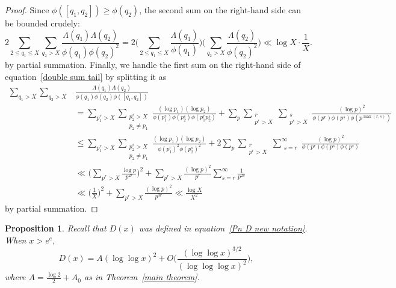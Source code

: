\documentclass[12pt,reqno]{amsart}
\newtheorem{prop}[theorem]{Proposition}
\theoremstyle{definition}
\begin{document}
\begin{proof}
Since $\phi([q_1, q_2]) \geq \phi(q_2)$, the second sum on the right-hand side can be bounded crudely:
\[
2 \sum_{2 \leq q_1 \leq X} \sum_{q_2 > X} \frac{\Lambda(q_1)\Lambda(q_2)}{\phi(q_1)\phi(q_2)^2} = 2 \bigg( \sum_{2 \leq q_1 \leq X} \frac{\Lambda(q_1)}{\phi(q_1)} \bigg) \bigg( \sum_{q_2 > X} \frac{\Lambda(q_2)}{\phi(q_2)^2} \bigg) \ll {\log X} \cdot \frac1{X}.
\]
by partial summation. Finally, we handle the first sum on the right-hand side of equation~\eqref{double sum tail} by splitting it as
\begin{align*}
\sum_{q_1>X}\sum_{q_2>X} & \frac{\Lambda(q_1)\Lambda(q_2)}{\phi(q_1)\phi(q_2)\phi([q_1, q_2])} \\
&= \sum_{p_1^r>X} \sum_{\substack{p_2^s>X \\ p_2\ne p_1}} \frac{(\log p_1)(\log p_2)}{\phi(p_1^r)\phi(p_2^s)\phi(p_1^r p_2^s)} + \sum_p \sum_{\substack{r \\ p^r > X}} \sum_{\substack{s \\ p^s > X}} \frac{(\log p)^2}{\phi(p^r)\phi(p^s)\phi(p^{\max(r, s)})} \\
&\le \sum_{p_1^r>X} \sum_{\substack{p_2^s>X \\ p_2\ne p_1}} \frac{(\log p_1)(\log p_2)}{\phi(p_1^r)^2\phi(p_2^s)^2} + 2 \sum_p \sum_{\substack{r \\ p^r > X}} \sum_{\substack{s=r}}^\infty \frac{(\log p)^2}{\phi(p^r)\phi(p^s)\phi(p^s)} \\
&\ll \bigg( \sum_{p^r > X} \frac{\log p}{p^{2r}} \bigg)^2 + \sum_{p^r>X} \frac{(\log p)^2}{p^r} \sum_{s=r}^\infty \frac1{p^{2s}} \\
&\ll \bigg( \frac1X \bigg)^2 + \sum_{p^r>X} \frac{(\log p)^2}{p^{3r}} \ll \frac{\log X}{X^2}
\end{align*}
by partial summation.
\end{proof}

\begin{prop}\label{constant in mean}
Recall that $D(x)$ was defined in equation~\eqref{Pn D new notation}. When $x>e^e$,
\[
D(x) = A(\log\log x)^2 + O\bigg(\frac{(\log\log x)^{3/2}}{(\log\log\log x)^2} \bigg),
\]
where $A = \displaystyle \frac{\log 2}{2} + A_0$ as in Theorem~\ref{main theorem}.
\end{prop}
\end{document}
